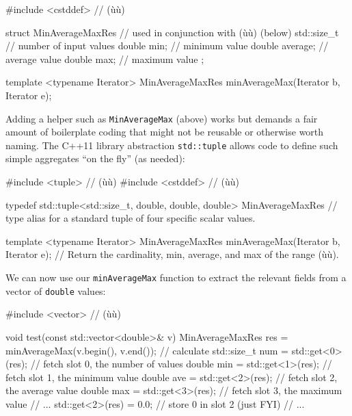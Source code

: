 \begin{emcppslisting}
#include <cstddef>  // (ù{}ù)

struct MinAverageMaxRes  // used in conjunction with (ù{}ù) (below)
{
    std::size_t             // number of input values
    double min;             // minimum value
    double average;         // average value
    double max;             // maximum value
};

template <typename Iterator>
MinAverageMaxRes minAverageMax(Iterator b, Iterator e);
\end{emcppslisting}
    

\noindent Adding a helper  such as \lstinline!MinAverageMax!
(above) works but demands a fair amount of boilerplate coding that might
not be reusable or otherwise worth naming. The C++11 library abstraction
\lstinline!std::tuple! allows code to define such simple aggregates ``on
the fly'' (as needed):

\begin{emcppslisting}
#include <tuple>    // (ù{}ù)
#include <cstddef>  // (ù{}ù)

typedef std::tuple<std::size_t, double, double, double> MinAverageMaxRes
    // type alias for a standard tuple of four specific scalar values.

template <typename Iterator>
MinAverageMaxRes minAverageMax(Iterator b, Iterator e);
    // Return the cardinality, min, average, and max of the range (ù{\codeincomments{[b, e]}}ù).
\end{emcppslisting}
    

\noindent We can now use our \lstinline!minAverageMax! function to extract the
relevant fields from a vector of \lstinline!double! values:

\begin{emcppslisting}
#include <vector>  // (ù{}ù)

void test(const std::vector<double>& v)
{
    MinAverageMaxRes res = minAverageMax(v.begin(), v.end());  // calculate
    std::size_t num = std::get<0>(res);  // fetch slot 0, the number of values
    double      min = std::get<1>(res);  // fetch slot 1, the minimum value
    double      ave = std::get<2>(res);  // fetch slot 2, the average value
    double      max = std::get<3>(res);  // fetch slot 3, the maximum value
    // ...
    std::get<2>(res) = 0.0;              // store 0 in slot 2 (just FYI)
    // ...
}
\end{emcppslisting}
    

